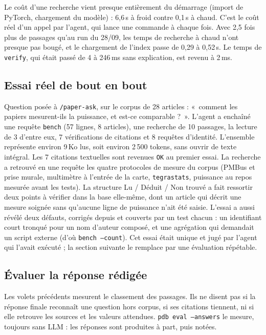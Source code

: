\documentclass[11pt,a4paper]{article}
\newcommand{\cmd}[1]{\texttt{#1}}
\begin{document}
Le coût d'une recherche vient presque entièrement du démarrage (import de PyTorch,
chargement du modèle) : 6,6\,s à froid contre 0,1\,s à chaud. C'est le coût réel d'un appel
par l'agent, qui lance une commande à chaque fois. Avec 2,5 fois plus de passages qu'au
run du 28/09, les temps de recherche à chaud n'ont presque pas bougé, et le chargement de
l'index passe de 0,29 à 0,52\,s. Le temps de \cmd{verify}, qui était passé de 4 à 246\,ms
sans explication, est revenu à 2\,ms.

\subsection{Essai réel de bout en bout}

Question posée à \cmd{/paper-ask}, sur le corpus de 28 articles : «~comment les papiers
mesurent-ils la puissance, et est-ce comparable ?~». L'agent a enchaîné une requête
\cmd{bench} (57 lignes, 8 articles), une recherche de 10 passages, la lecture de 3 d'entre
eux, 7 vérifications de citations et 8 requêtes d'identité. L'ensemble représente environ
9\,Ko lus, soit environ 2\,500 tokens, sans ouvrir de texte intégral. Les 7 citations
textuelles sont revenues \cmd{OK} au premier essai. La recherche a retrouvé en une requête
les quatre protocoles de mesure du corpus (PMBus et prise murale, multimètre à l'entrée de la
carte, \cmd{tegrastats}, puissance au repos mesurée avant les tests). La structure Lu /
Déduit / Non trouvé a fait ressortir deux points à vérifier dans la base elle-même, dont un
article qui décrit une mesure soignée sans qu'aucune ligne de puissance n'ait été saisie.
L'essai a aussi révélé deux défauts, corrigés depuis et couverts par un test chacun : un
identifiant court tronqué pour un nom d'auteur composé, et une agrégation qui demandait un
script externe (d'où \cmd{bench --count}). Cet essai était unique et jugé par l'agent qui
l'avait exécuté ; la section suivante le remplace par une évaluation répétable.

\subsection{Évaluer la réponse rédigée}
\label{sec:answers}

Les volets précédents mesurent le classement des passages. Ils ne disent pas si la réponse
finale reconnaît une question hors corpus, si ses citations tiennent, ni si elle retrouve
les sources et les valeurs attendues. \cmd{pdb eval --answers} le mesure, toujours sans LLM :
les réponses sont produites à part, puis notées.
\end{document}

